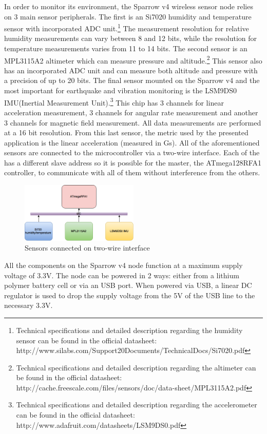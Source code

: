 In order to monitor its environment, the Sparrow v4 wireless sensor node relies on 3 main sensor peripherals. The first is 
an Si7020 humidity and temperature sensor with incorporated ADC unit.\footnote{Technical specifications and detailed description regarding the humidity sensor can be found in the official datasheet: http://www.silabs.com/Support20Documents/TechnicalDocs/Si7020.pdf}
The measurement resolution for relative humidity measurements
can vary between 8 and 12 bits, while the resolution for temperature measurements varies from 11 to 14 bits. The second sensor is 
an MPL3115A2 altimeter which can measure pressure and altitude.\footnote{Technical specifications and detailed description regarding the altimeter can be found in the official datasheet: http://cache.freescale.com/files/sensors/doc/data-sheet/MPL3115A2.pdf} 
This sensor also has an incorporated ADC unit and can measure 
both altitude and pressure with a precision of up to 20 bits. The final sensor mounted on the Sparrow v4 and the most important for 
earthquake and vibration monitoring is the LSM9DS0 IMU(Inertial Measurement Unit).\footnote{Technical specifications and detailed description regarding the accelerometer can be found in the official datasheet: http://www.adafruit.com/datasheets/LSM9DS0.pdf} 
This chip has 3 channels for linear acceleration measurement, 
3 channels for angular rate measurement and another 3 channels for magnetic field measurement. All data measurements are performed at a 
16 bit resolution. From this last sensor, the metric used by the presented application is the linear acceleration (measured in Gs).
All of the aforementioned sensors are connected to the microcontroller via a two-wire interface. Each of the has a different slave address so 
it is possible for the master, the ATmega128RFA1 controller, to communicate with all of them without interference from the others.

\begin{figure}[ht] \centering
  \includegraphics[width=0.5\textwidth]{img/i2c-conn.png}
  \caption{Sensors connected on two-wire interface}
\end{figure}

All the components on the Sparrow v4 node function at a maximum supply voltage of 3.3V. The node can be powered in 2 ways: either from a lithium polymer battery 
cell or via an USB port. When powered via USB, a linear DC regulator is used to drop the supply voltage from the 5V of the USB line to the necessary 3.3V.

